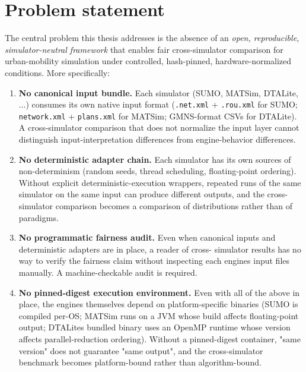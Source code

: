 \section{Problem statement}\label{12-problem-statement}

The central problem this thesis addresses is the absence of an
\emph{open, reproducible, simulator-neutral framework} that enables fair
cross-simulator comparison for urban-mobility simulation under
controlled, hash-pinned, hardware-normalized conditions. More
specifically:

\begin{enumerate}
\def\labelenumi{\arabic{enumi}.}
\item
  \textbf{No canonical input bundle.} Each simulator (SUMO, MATSim,
  DTALite, ...) consumes its own native input format (\texttt{.net.xml}
  + \texttt{.rou.xml} for SUMO; \texttt{network.xml} +
  \texttt{plans.xml} for MATSim; GMNS-format CSVs for DTALite). A
  cross-simulator comparison that does not normalize the input layer
  cannot distinguish input-interpretation differences from
  engine-behavior differences.
\item
  \textbf{No deterministic adapter chain.} Each simulator has its own
  sources of non-determinism (random seeds, thread scheduling,
  floating-point ordering). Without explicit deterministic-execution
  wrappers, repeated runs of the same simulator on the same input can
  produce different outputs, and the cross-simulator comparison becomes
  a comparison of distributions rather than of paradigms.
\item
  \textbf{No programmatic fairness audit.} Even when canonical inputs
  and deterministic adapters are in place, a reader of cross- simulator
  results has no way to verify the fairness claim without inspecting
  each engine\textquotesingle s input files manually. A
  machine-checkable audit is required.
\item
  \textbf{No pinned-digest execution environment.} Even with all of the
  above in place, the engines themselves depend on platform-specific
  binaries (SUMO is compiled per-OS; MATSim runs on a JVM whose build
  affects floating-point output; DTALite\textquotesingle s bundled
  binary uses an OpenMP runtime whose version affects parallel-reduction
  ordering). Without a pinned-digest container, "same version" does not
  guarantee "same output", and the cross-simulator benchmark becomes
  platform-bound rather than algorithm-bound.
\end{enumerate}

